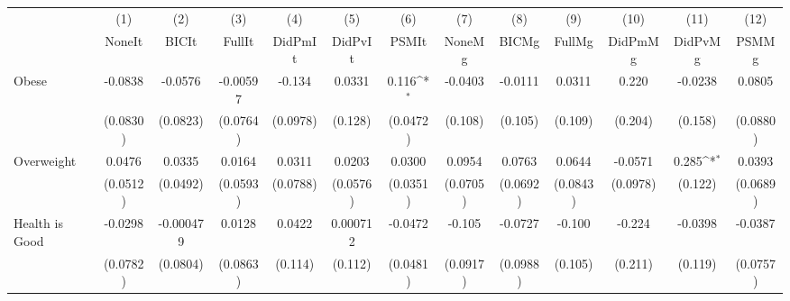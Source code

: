 {
\def\sym#1{\ifmmode^{#1}\else\(^{#1}\)\fi}
\begin{tabular}{l*{12}{c}}
\toprule
            &\multicolumn{1}{c}{(1)}&\multicolumn{1}{c}{(2)}&\multicolumn{1}{c}{(3)}&\multicolumn{1}{c}{(4)}&\multicolumn{1}{c}{(5)}&\multicolumn{1}{c}{(6)}&\multicolumn{1}{c}{(7)}&\multicolumn{1}{c}{(8)}&\multicolumn{1}{c}{(9)}&\multicolumn{1}{c}{(10)}&\multicolumn{1}{c}{(11)}&\multicolumn{1}{c}{(12)}\\
            &\multicolumn{1}{c}{NoneIt}&\multicolumn{1}{c}{BICIt}&\multicolumn{1}{c}{FullIt}&\multicolumn{1}{c}{DidPmIt}&\multicolumn{1}{c}{DidPvIt}&\multicolumn{1}{c}{PSMIt}&\multicolumn{1}{c}{NoneMg}&\multicolumn{1}{c}{BICMg}&\multicolumn{1}{c}{FullMg}&\multicolumn{1}{c}{DidPmMg}&\multicolumn{1}{c}{DidPvMg}&\multicolumn{1}{c}{PSMMg}\\
\midrule
Obese       &     -0.0838         &     -0.0576         &    -0.00597         &      -0.134         &      0.0331         &       0.116\sym{*}  &     -0.0403         &     -0.0111         &      0.0311         &       0.220         &     -0.0238         &      0.0805         \\
            &    (0.0830)         &    (0.0823)         &    (0.0764)         &    (0.0978)         &     (0.128)         &    (0.0472)         &     (0.108)         &     (0.105)         &     (0.109)         &     (0.204)         &     (0.158)         &    (0.0880)         \\
\addlinespace
Overweight  &      0.0476         &      0.0335         &      0.0164         &      0.0311         &      0.0203         &      0.0300         &      0.0954         &      0.0763         &      0.0644         &     -0.0571         &       0.285\sym{*}  &      0.0393         \\
            &    (0.0512)         &    (0.0492)         &    (0.0593)         &    (0.0788)         &    (0.0576)         &    (0.0351)         &    (0.0705)         &    (0.0692)         &    (0.0843)         &    (0.0978)         &     (0.122)         &    (0.0689)         \\
\addlinespace
Health is Good&     -0.0298         &   -0.000479         &      0.0128         &      0.0422         &    0.000712         &     -0.0472         &      -0.105         &     -0.0727         &      -0.100         &      -0.224         &     -0.0398         &     -0.0387         \\
            &    (0.0782)         &    (0.0804)         &    (0.0863)         &     (0.114)         &     (0.112)         &    (0.0481)         &    (0.0917)         &    (0.0988)         &     (0.105)         &     (0.211)         &     (0.119)         &    (0.0757)         \\

\end{tabular}}
